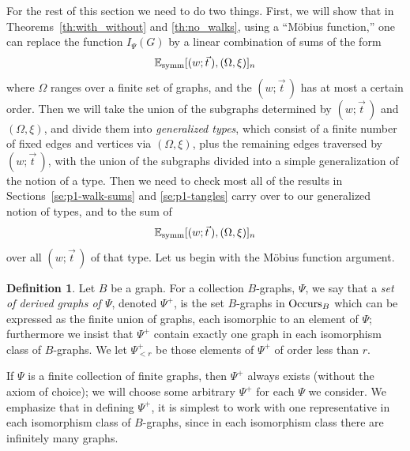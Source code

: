 \documentclass{memo-l}
\newcommand{\nonsigma}{\xi}
\theoremstyle{plain}
\theoremstyle{definition}
\newtheorem{definition}[theorem]{Definition}
\numberwithin{section}{chapter}
\numberwithin{equation}{chapter}
\newcommand{\potwalk}{(w;\vec t\,)}
\theoremstyle{plain}
\theoremstyle{definition}
\newcommand\EE{\mathbb{E}}
\begin{document}
For the rest of this section we need to do two things.
First, we will show that in Theorems~\ref{th:with_without} and
\ref{th:no_walks}, using a ``M\"obius function,'' one can
replace the function $I_\Psi(G)$ by a linear combination of 
sums of the form
$$
\EE_{\rm symm}[\potwalk,(\Omega,\nonsigma)]_n
$$
where $\Omega$ ranges over a finite set of graphs, and the
$\potwalk$ has at most a certain order.
Then we will take
the union of the subgraphs determined by $\potwalk$ and
$(\Omega,\nonsigma)$, and divide them into {\em generalized types},
which consist of a finite number of fixed edges and vertices via
$(\Omega,\nonsigma)$, plus the remaining edges traversed by
$\potwalk$, with the union of the subgraphs divided into 
a simple generalization of the notion of a type.
Then we need to check most all of the results 
in Sections~\ref{se:p1-walk-sums} and \ref{se:p1-tangles}
carry over to our generalized notion of types, and to the sum of
$$
\EE_{\rm symm}[\potwalk,(\Omega,\nonsigma)]_n
$$
over all $\potwalk$ of that type.
Let us begin with the M\"obius function argument.

\begin{definition}
Let $B$ be a graph.  
For a collection $B$-graphs, $\Psi$, we
say that 
a \emph{set of derived graphs of \( \Psi \)}, denoted \( \Psi^+ \), 
is the set
\( B \)-graphs in \( {\rm Occurs}_B \) which can be expressed as the finite
union of graphs, each isomorphic to an element of $\Psi$; furthermore
we insist that $\Psi^+$ contain exactly one graph in each isomorphism class
of $B$-graphs.
We let
$\Psi^+_{<r}$ be those elements of \( \Psi^+ \) of order less than \( r
\). 
\end{definition}
If $\Psi$ is a finite collection of finite graphs, then $\Psi^+$ always
exists (without the axiom of choice); we will choose some arbitrary
$\Psi^+$ for each $\Psi$ we consider.
We emphasize that in defining $\Psi^+$,
it is simplest to work with one representative
in each isomorphism class of $B$-graphs,
since in each isomorphism class there are infinitely many
graphs.
\end{document}
